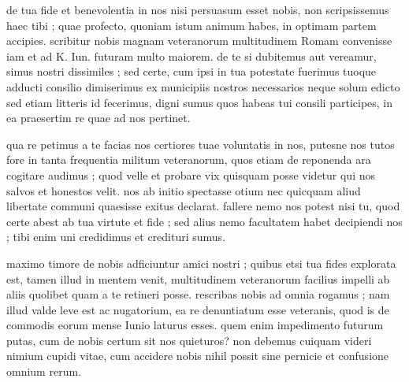 


 de tua fide et benevolentia in nos nisi persuasum esset nobis, non scripsissemus haec tibi ; quae profecto, quoniam istum animum habes, in optimam partem accipies. scribitur nobis magnam veteranorum multitudinem Romam convenisse iam et ad K. Iun. futuram multo maiorem. de te si dubitemus aut vereamur, simus nostri dissimiles ; sed certe, cum ipsi in tua potestate fuerimus tuoque adducti consilio dimiserimus ex municipiis nostros necessarios neque solum edicto sed etiam litteris id fecerimus, digni sumus quos habeas tui consili participes, in ea praesertim re quae ad nos pertinet.

 qua re petimus a te facias nos certiores tuae voluntatis in nos, putesne nos tutos fore in tanta frequentia militum veteranorum, quos etiam de reponenda ara cogitare audimus ; quod velle et probare vix quisquam posse videtur qui nos salvos et honestos velit. nos ab initio spectasse otium nec quicquam aliud libertate communi quaesisse exitus declarat. fallere nemo nos potest nisi tu, quod certe abest ab tua virtute et fide ; sed alius nemo facultatem habet decipiendi nos ; tibi enim uni credidimus et credituri sumus.

 maximo timore de nobis adficiuntur amici nostri ; quibus etsi tua fides explorata est, tamen illud in mentem venit, multitudinem veteranorum facilius impelli ab aliis quolibet quam a te retineri posse. rescribas nobis ad omnia rogamus ; nam illud valde leve est ac nugatorium, ea re denuntiatum esse veteranis, quod is de commodis eorum mense Iunio laturus esses. quem enim impedimento futurum putas, cum de nobis certum sit nos quieturos? non debemus cuiquam videri nimium cupidi vitae, cum accidere nobis nihil possit sine pernicie et confusione omnium rerum.
